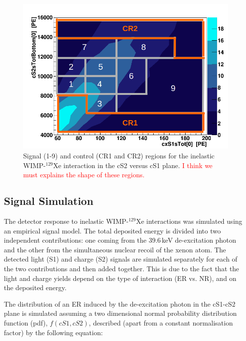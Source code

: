 {\begin{figure}[t!]
  \includegraphics[width=\linewidth]{images/bkg_in_sr.png}
  \caption{Signal (1-9) and control (CR1 and CR2) regions for the inelastic WIMP-$^{129}$Xe interaction in the cS2 versus cS1 plane. {\textcolor{red} {I think we must explains the shape of these regions.}}}
  \label{fig:SR}
\end{figure}



\subsection{Signal Simulation} 

The detector response to inelastic WIMP-$^{129}$Xe interactions was simulated using an empirical signal model.
The total deposited energy is divided into two independent contributions: one coming from the 39.6\,keV de-excitation photon and the other  from  
the simultaneous nuclear recoil of the xenon atom. The detected light (S1) and charge (S2) signals are simulated separately for each of the two contributions 
and then added together. This is due to the fact that the light and charge yields depend on the type of interaction (ER vs. NR), and on the deposited energy.


The distribution of an ER induced by the de-excitation photon in the cS1-cS2 plane  is simulated assuming a two dimensional normal probability distribution function (pdf), $f(cS1,cS2)$, 
described (apart from a constant normalisation factor) by the following equation:

}
